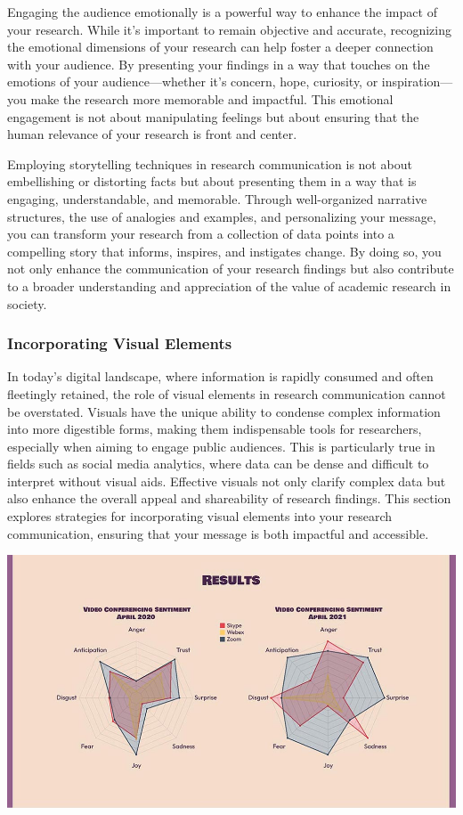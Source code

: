 \documentclass[
]{book}
\begin{document}
Engaging the audience emotionally is a powerful way to enhance the impact of your research. While it's important to remain objective and accurate, recognizing the emotional dimensions of your research can help foster a deeper connection with your audience. By presenting your findings in a way that touches on the emotions of your audience---whether it's concern, hope, curiosity, or inspiration---you make the research more memorable and impactful. This emotional engagement is not about manipulating feelings but about ensuring that the human relevance of your research is front and center.

Employing storytelling techniques in research communication is not about embellishing or distorting facts but about presenting them in a way that is engaging, understandable, and memorable. Through well-organized narrative structures, the use of analogies and examples, and personalizing your message, you can transform your research from a collection of data points into a compelling story that informs, inspires, and instigates change. By doing so, you not only enhance the communication of your research findings but also contribute to a broader understanding and appreciation of the value of academic research in society.

\subsubsection*{Incorporating Visual Elements}\label{incorporating-visual-elements}

In today's digital landscape, where information is rapidly consumed and often fleetingly retained, the role of visual elements in research communication cannot be overstated. Visuals have the unique ability to condense complex information into more digestible forms, making them indispensable tools for researchers, especially when aiming to engage public audiences. This is particularly true in fields such as social media analytics, where data can be dense and difficult to interpret without visual aids. Effective visuals not only clarify complex data but also enhance the overall appeal and shareability of research findings. This section explores strategies for incorporating visual elements into your research communication, ensuring that your message is both impactful and accessible.

\includegraphics[width=1\linewidth,height=\textheight,keepaspectratio]{images/fig089.jpg}
\end{document}
